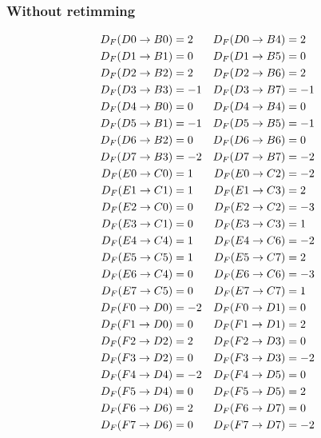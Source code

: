 \documentclass[journal,comsoc]{IEEEtran}
\begin{document}
\subsubsection{Without retimming\label{sec:appen:folding_eq}}
\begin{small}
\begin{align*}\small
D_F(D0\to B0)&=2 &  D_F(D0\to B4)&=2\\
D_F(D1\to B1)&=0 &  D_F(D1\to B5)&=0\\
D_F(D2\to B2)&=2 &  D_F(D2\to B6)&=2\\
D_F(D3\to B3)&=-1& D_F(D3\to B7)&=-1\\
D_F(D4\to B0)&=0 &  D_F(D4\to B4)&=0\\
D_F(D5\to B1)&=-1& D_F(D5\to B5)&=-1\\
D_F(D6\to B2)&=0 &  D_F(D6\to B6)&=0\\
D_F(D7\to B3)&=-2& D_F(D7\to B7)&=-2\\
D_F(E0\to C0)&=1 &  D_F(E0\to C2)&=-2\\
D_F(E1\to C1)&=1 &  D_F(E1\to C3)&=2\\
D_F(E2\to C0)&=0 &  D_F(E2\to C2)&=-3\\
D_F(E3\to C1)&=0 &  D_F(E3\to C3)&=1\\
D_F(E4\to C4)&=1 &  D_F(E4\to C6)&=-2\\
D_F(E5\to C5)&=1 &  D_F(E5\to C7)&=2\\
D_F(E6\to C4)&=0 &  D_F(E6\to C6)&=-3\\
D_F(E7\to C5)&=0 &  D_F(E7\to C7)&=1\\
D_F(F0\to D0)&=-2& D_F(F0\to D1)&=0\\
D_F(F1\to D0)&=0 &  D_F(F1\to D1)&=2\\
D_F(F2\to D2)&=2 &  D_F(F2\to D3)&=0\\
D_F(F3\to D2)&=0 &  D_F(F3\to D3)&=-2\\
D_F(F4\to D4)&=-2&  D_F(F4\to D5)&=0\\
D_F(F5\to D4)&=0 &  D_F(F5\to D5)&=2\\
D_F(F6\to D6)&=2 &  D_F(F6\to D7)&=0\\
D_F(F7\to D6)&=0 &  D_F(F7\to D7)&=-2\\
\end{align*}
\end{small}

\end{document}
